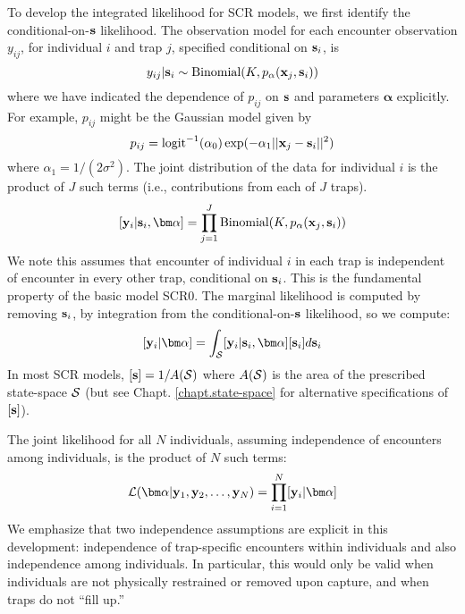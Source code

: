  To develop the integrated
likelihood for SCR models, we first identify the conditional-on-${\bf s}$
likelihood. 
The observation model for each encounter observation $y_{ij}$, for
individual $i$ and trap $j$,
specified conditional on ${\bf s}_{i}$, is 
\begin{equation}
y_{ij}| {\bf s}_{i} \sim \mbox{Binomial}(K, p_{\alpha}({\bf x}_{j},{\bf s}_{i}))
\label{mle.eq.cond-on-s}
\end{equation}
where we have indicated the dependence of $p_{ij}$ on ${\bf s}$ and
parameters ${\bm \alpha}$
explicitly. For example, $p_{ij}$ might be the Gaussian model given by
\[
 p_{ij} = \mbox{logit}^{-1}(\alpha_{0})\exp( -\alpha_{1} ||{\bf x}_{j} - {\bf s}_{i}||^{2})
\]
where $\alpha_{1} = 1/(2\sigma^2)$.
The joint distribution of the data for individual $i$ is the product
of $J$ such terms (i.e., contributions from each of $J$ traps).
\[
  [{\bf y}_{i} | {\bf s}_{i} , {\bm \alpha}] = 
  \prod_{j=1}^{J} \mbox{Binomial}(K, p_{\alpha}({\bf x}_{j},{\bf s}_{i}) )
\]
We note this assumes that encounter of individual $i$ in each
trap is independent of encounter in every other trap, conditional on
${\bf s}_{i}$. This is the fundamental property of the basic model SCR0.
The marginal likelihood is computed by removing
${\bf s}_{i}$, by integration from the conditional-on-${\bf s}$
likelihood, so we compute:
\[
  [{\bf y}_{i}|{\bm \alpha}] = 
\int_{{\cal S}}  [ {\bf y}_{i} |{\bf s}_{i}, {\bm \alpha}] [{\bf s}_{i}] d{\bf s}_{i}
\]
In most SCR models, $[{\bf s}] = 1/A({\cal S})$ where $A({\cal S})$ is
the area of the prescribed state-space ${\cal S}$ (but see Chapt. \ref{chapt.state-space} for
alternative specifications of $[{\bf s}]$).

The joint likelihood for all $N$ individuals, assuming independence of
encounters among individuals, is the product of $N$ such terms:
\[
{\cal L}({\bm \alpha} | {\bf y}_{1},{\bf y}_{2},\ldots, {\bf y}_{N}) =     \prod_{i=1}^{N}
[{\bf y}_{i}|{\bm \alpha}]
\]
We emphasize that two independence assumptions are explicit in this
development: independence of trap-specific encounters within
individuals and also independence among individuals. In particular,
this would only be valid when individuals are not physically
restrained or removed upon capture, and when traps do not ``fill up.''


